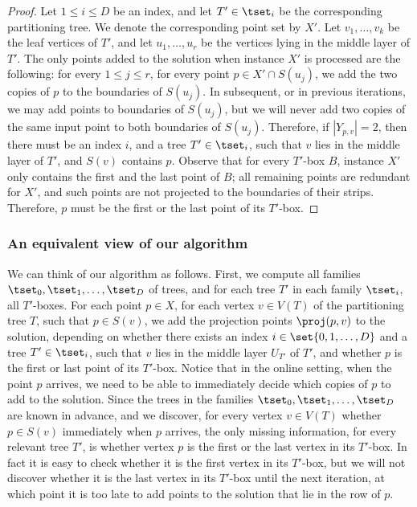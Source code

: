 \documentclass{toc}
\begin{document}
\begin{proof}
	Let $1\leq i\leq D$ be an index, and let $T'\in \tset_i$ be the corresponding partitioning tree. We denote the corresponding point set by $X'$. Let $v_1,\ldots,v_k$ be the leaf vertices of $T'$, and let $u_1,\ldots,u_r$ be the vertices lying in the middle layer of $T'$. The only points added to the solution when instance $X'$ is processed are the following: for every $1\leq j\leq r$, for every point $p\in X'\cap S(u_j)$, we add the two copies of $p$ to the boundaries of $S(u_j)$. In subsequent, or in previous iterations, we may add points to boundaries of $S(u_j)$, but we will never add two copies of the same input point to both boundaries of $S(u_j)$. Therefore, if $|Y_{p,v}|=2$, then there must be an index $i$, and a tree $T'\in \tset_i$, such that $v$ lies in the middle layer of $T'$, and $S(v)$ contains $p$. Observe that for every $T'$-box $B$, instance $X'$ only contains the first and the last point of $B$; all remaining points are redundant for $X'$, and such points are not projected to the boundaries of their strips. Therefore, $p$ must be the first or the last point of its $T'$-box.
	\end{proof}



\subsubsection{An equivalent view of our algorithm}


We can think of our algorithm as follows.
First, we compute all families $\tset_0,\tset_1, \ldots, \tset_D$ of trees, and for each tree $T'$ in each family $\tset_i$, all $T'$-boxes.
For each point $p \in X$, for each vertex $v \in V(T)$ of the partitioning tree $T$, such that $p\in S(v)$, we add the projection points $\proj(p,v)$ to the solution, depending on whether there exists an index $i \in \set{0,1,\ldots, D}$ and a tree $T' \in \tset_i$, such that $v$ lies in the middle layer $U_{T'}$ of $T'$,  and whether $p$ is the first or last point of its $T'$-box. Notice that in the online setting, when the point $p$ arrives, we need to be able to immediately decide which copies of $p$ to add to the solution. Since the trees in the families $\tset_0,\tset_1,\ldots,\tset_D$ are known in advance, and we discover, for every vertex $v\in V(T)$ whether $p\in S(v)$ immediately when $p$ arrives, the only missing information, for every relevant tree $T'$, is whether vertex $p$ is the first or the last vertex in its $T'$-box. In fact it is easy to check whether it is the first vertex in its $T'$-box, but we will not discover whether it is the last vertex in its $T'$-box until the next iteration, at which point it is too late to add points to the solution that lie in the row of $p$.
\end{document}
